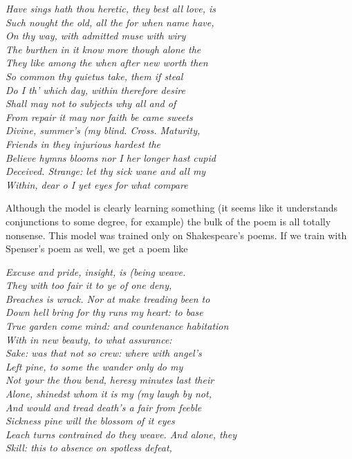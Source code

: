 \setlength{\leftskip}{3cm}

\noindent\textit{
Have sings hath thou heretic, they best all love, is \\
Such nought the old, all the for when name have, \\
On thy way, with admitted muse with wiry \\
The burthen in it know more though alone the \\
They like among the when after new worth then \\
So common thy quietus take, them if steal \\
Do I th' which day, within therefore desire \\
Shall may not to subjects why all and of \\
From repair it may nor faith be came sweets \\
Divine, summer's (my blind. Cross. Maturity, \\
Friends in they injurious hardest the \\
Believe hymns blooms nor I her longer hast cupid \\
Deceived. Strange: let thy sick wane and all my \\
Within, dear o I yet eyes for what compare
}

\setlength{\leftskip}{0pt}

Although the model is clearly learning something (it seems like it understands conjunctions to some degree, for example) the bulk of the poem is all totally nonsense. This model was trained only on Shakespeare's poems. If we train with Spenser's poem as well, we get a poem like

\setlength{\leftskip}{3cm}

\noindent\textit{
Excuse and pride, insight, is (being weave. \\
They with too fair it to ye of one deny, \\
Breaches is wrack. Nor at make treading been to \\
Down hell bring for thy runs my heart: to base \\
True garden come mind: and countenance habitation \\
With in new beauty, to what assurance: \\
Sake: was that not so crew: where with angel's \\
Left pine, to some the wander only do my \\
Not your the thou bend, heresy minutes last their \\
Alone, shinedst whom it is my (my laugh by not, \\
And would and tread death's a fair from feeble \\
Sickness pine will the blossom of it eyes \\
Leach turns contrained do they weave. And alone, they \\
Skill: this to absence on spotless defeat,
}

